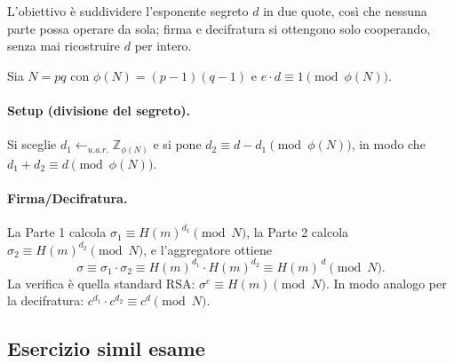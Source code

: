 \documentclass[a4paper, 11pt]{article}
\begin{document}
L'obiettivo è suddividere l'esponente segreto $d$ in due quote, così che nessuna parte possa operare da sola; firma e decifratura si ottengono solo cooperando, senza mai ricostruire $d$ per intero.

Sia $N=pq$ con $\phi(N)=(p-1)(q-1)$ e $e\cdot d \equiv 1 \pmod{\phi(N)}$.

\paragraph{Setup (divisione del segreto).}
Si sceglie $d_1 \gets_{u.a.r.} \mathbb{Z}_{\phi(N)}$ e si pone $d_2 \equiv d - d_1 \pmod{\phi(N)}$, in modo che $d_1 + d_2 \equiv d \pmod{\phi(N)}$.

\paragraph{Firma/Decifratura.}
La Parte 1 calcola $\sigma_1 \equiv H(m)^{d_1} \pmod N$, la Parte 2 calcola $\sigma_2 \equiv H(m)^{d_2} \pmod N$, e l’aggregatore ottiene
\[
\sigma \equiv \sigma_1 \cdot \sigma_2
\equiv H(m)^{d_1}\cdot H(m)^{d_2}
\equiv H(m)^{\,d} \pmod N.
\]
La verifica è quella standard RSA: $\sigma^e \equiv H(m) \pmod N$.
In modo analogo per la decifratura: $c^{d_1}\cdot c^{d_2} \equiv c^{d} \pmod N$.

\newpage

\subsection{Esercizio simil esame}
\end{document}
